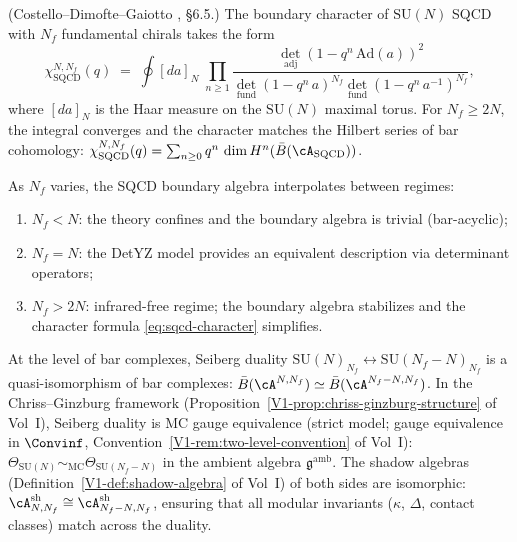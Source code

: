 \begin{example}
\textup{(Costello--Dimofte--Gaiotto \cite{CDG2023}, \S6.5.)}
The boundary character of $\mathrm{SU}(N)$ SQCD with $N_f$
fundamental chirals takes the form
\begin{equation}%
 \chi_{\mathrm{SQCD}}^{N,N_f}(q)
 \;=\;
 \oint [da]_{N}\;
 \prod_{n \geq 1}
 \frac{\det_{\mathrm{adj}}(1 - q^n\,\mathrm{Ad}(a))^2}
 {\det_{\mathrm{fund}}(1-q^n\,a)^{N_f}
 \det_{\mathrm{fund}}(1-q^n\,a^{-1})^{N_f}},
\end{equation}
where $[da]_N$ is the Haar measure on the $\mathrm{SU}(N)$ maximal
torus. For $N_f \geq 2N$, the integral converges and the character
matches the Hilbert series of bar cohomology:
$\chi_{\mathrm{SQCD}}^{N,N_f}(q) = \sum_{n \geq 0} q^n\,\dim
H^n(\bar{B}(\cA_{\mathrm{SQCD}}))$.
\end{example}

\begin{remark}
As $N_f$ varies, the SQCD boundary algebra interpolates between
regimes:
\begin{enumerate}[label=\textup{(\roman*)},nosep]
\item $N_f < N$: the theory confines and the boundary algebra is
 trivial (bar-acyclic);
\item $N_f = N$: the DetYZ model provides an equivalent
 description via determinant operators;
\item $N_f > 2N$: infrared-free regime; the boundary algebra
 stabilizes and the character formula
 \eqref{eq:sqcd-character} simplifies.
\end{enumerate}
At the level of bar complexes, Seiberg duality
$\mathrm{SU}(N)_{N_f} \leftrightarrow \mathrm{SU}(N_f - N)_{N_f}$
is a quasi-isomorphism of bar complexes:
$\bar{B}(\cA^{N,N_f}) \simeq \bar{B}(\cA^{N_f-N,N_f})$. In the
Chriss--Ginzburg framework
(Proposition~\ref*{V1-prop:chriss-ginzburg-structure} of Vol~I), Seiberg
duality is MC gauge equivalence
(strict model; gauge equivalence in $\Convinf$, Convention~\ref*{V1-rem:two-level-convention} of Vol~I):
$\Theta_{\mathrm{SU}(N)} \sim_{\mathrm{MC}}
\Theta_{\mathrm{SU}(N_f-N)}$ in the ambient algebra
$\mathfrak{g}^{\mathrm{amb}}$. The shadow algebras
(Definition~\ref*{V1-def:shadow-algebra} of Vol~I) of both sides are
isomorphic: $\cA^{\mathrm{sh}}_{N,N_f} \cong
\cA^{\mathrm{sh}}_{N_f-N,N_f}$, ensuring that all modular
invariants ($\kappa$, $\Delta$, contact classes) match
across the duality.
\end{remark}
